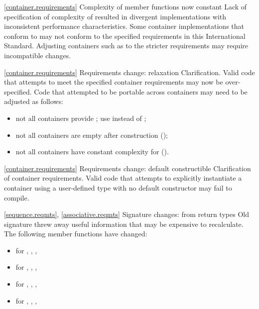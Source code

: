 \ref{container.requirements}
\change Complexity of  member functions now constant
\rationale Lack of specification of complexity of  resulted in
divergent implementations with inconsistent performance characteristics.
\effect
Some container implementations that conform to \CppIII may not conform to the
specified  requirements in this International Standard. Adjusting
containers such as  to the stricter requirements may require
incompatible changes.

\ref{container.requirements}
\change Requirements change: relaxation
\rationale Clarification.
\effect
Valid \CppIII code that attempts to meet the specified container requirements
may now be over-specified. Code that attempted to be portable across containers
may need to be adjusted as follows:
\begin{itemize}
\item not all containers provide ; use  instead
of ;
\item not all containers are empty after construction ();
\item not all containers have constant complexity for  ().
\end{itemize}

\ref{container.requirements}
\change Requirements change: default constructible
\rationale Clarification of container requirements.
\effect
Valid \CppIII code that attempts to explicitly instantiate a container using
a user-defined type with no default constructor may fail to compile.

\ref{sequence.reqmts}, \ref{associative.reqmts}
\change Signature changes: from  return types
\rationale Old signature threw away useful information that may be expensive
to recalculate.
\effect
The following member functions have changed:
\begin{itemize}
\item {} for , , , 
\item {} for , , , 
\item {} for , , , 
\item {} for , , , 
\end{itemize}

